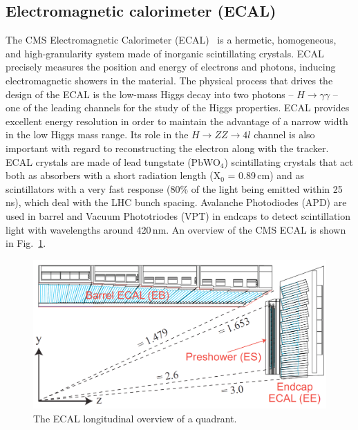 \subsection{Electromagnetic calorimeter (ECAL)}
The CMS Electromagnetic Calorimeter (ECAL)~\cite{ecal} is a hermetic, homogeneous, and high-granularity system made of inorganic scintillating crystals. ECAL precisely measures the position and energy of electrons and photons, inducing electromagnetic showers in the material. The physical process that drives the design of the ECAL is the low-mass Higgs decay into two photons – $H \rightarrow \gamma\gamma$ – one of the leading channels for the study of the Higgs properties. ECAL provides excellent energy resolution in order to maintain the advantage of a narrow width in the low Higgs mass range. Its role in the $H \rightarrow ZZ \rightarrow 4l$ channel is also important with regard to reconstructing the electron along with the tracker. ECAL crystals are made of lead tungstate (PbWO$_{4}$) scintillating crystals that act both as absorbers with a short radiation length (X$_{0}$ = 0.89\,cm) and as scintillators with a very fast response (80\% of the light being emitted within 25\,ns), which deal with the LHC bunch spacing. Avalanche Photodiodes (APD) are used in barrel and Vacuum Phototriodes (VPT) in endcaps to detect scintillation light with wavelengths around 420\,nm. An overview of the CMS ECAL is shown in Fig.~\ref{fig:ecal}.
\begin{figure}[h]
\centering
\includegraphics[scale=0.3]{fig/lhc/img_ECALRapidity.png}
\caption{\label{fig:ecal} The ECAL longitudinal overview of a quadrant.}
\end{figure}
